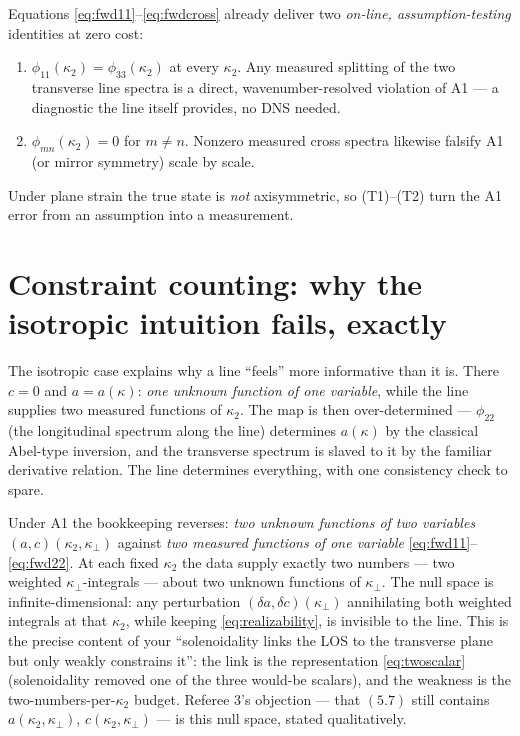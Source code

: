 \documentclass[11pt,a4paper]{article}
\newcommand{\kperp}{\kappa_\perp}
\begin{document}
Equations \eqref{eq:fwd11}--\eqref{eq:fwdcross} already deliver two
\emph{on-line, assumption-testing} identities at zero cost:
\begin{enumerate}[label=(T\arabic*),leftmargin=2.4em]
\item $\phi_{11}(\kappa_2)=\phi_{33}(\kappa_2)$ at every $\kappa_2$. Any
  measured splitting of the two transverse line spectra is a direct,
  wavenumber-resolved violation of A1 --- a diagnostic the line itself
  provides, no DNS needed.
\item $\phi_{mn}(\kappa_2)=0$ for $m\ne n$. Nonzero measured cross spectra
  likewise falsify A1 (or mirror symmetry) scale by scale.
\end{enumerate}
Under plane strain the true state is \emph{not} axisymmetric, so (T1)--(T2)
turn the A1 error from an assumption into a measurement.

\section{Constraint counting: why the isotropic intuition fails, exactly}
\label{sec:counting}

The isotropic case explains why a line ``feels'' more informative than it is.
There $c=0$ and $a=a(\kappa)$: \emph{one unknown function of one variable},
while the line supplies two measured functions of $\kappa_2$. The map is then
over-determined --- $\phi_{22}$ (the longitudinal spectrum along the line)
determines $a(\kappa)$ by the classical Abel-type inversion, and the
transverse spectrum is slaved to it by the familiar derivative relation. The
line determines everything, with one consistency check to spare.

Under A1 the bookkeeping reverses: \emph{two unknown functions of two
variables} $(a,c)(\kappa_2,\kperp)$ against \emph{two measured functions of
one variable} \eqref{eq:fwd11}--\eqref{eq:fwd22}. At each fixed $\kappa_2$ the
data supply exactly two numbers --- two weighted $\kperp$-integrals --- about
two unknown functions of $\kperp$. The null space is infinite-dimensional:
any perturbation $(\delta a,\delta c)(\kperp)$ annihilating both weighted
integrals at that $\kappa_2$, while keeping \eqref{eq:realizability}, is
invisible to the line. This is the precise content of your ``solenoidality
links the LOS to the transverse plane but only weakly constrains it'': the
link is the representation \eqref{eq:twoscalar} (solenoidality removed one of
the three would-be scalars), and the weakness is the two-numbers-per-$\kappa_2$
budget. Referee 3's objection --- that $(5.7)$ still contains
$a(\kappa_2,\kperp)$, $c(\kappa_2,\kperp)$ --- is this null space, stated
qualitatively.
\end{document}
